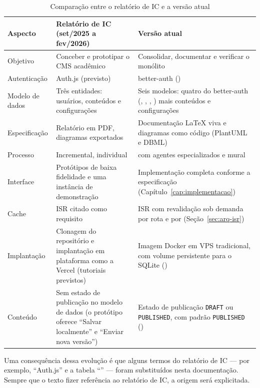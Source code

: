 \begin{table}[htb]
\caption{Comparação entre o relatório de IC e a versão atual}\label{tab:ic-vs-atual}
\small
\begin{tabularx}{\linewidth}{@{}L{2.9cm}YY@{}}
\toprule
\textbf{Aspecto} & \textbf{Relatório de IC (set/2025 a fev/2026)} & \textbf{Versão atual}\\
\midrule
Objetivo & Conceber e prototipar o CMS acadêmico & Consolidar, documentar e verificar o monólito\\
\addlinespace
Autenticação & Auth.js (previsto) & better-auth ()\\
\addlinespace
Modelo de dados & Três entidades: usuários, conteúdos e configurações & Seis modelos: quatro do better-auth (, , , ) mais conteúdos e configurações\\
\addlinespace
Especificação & Relatório em PDF, diagramas exportados & Documentação \LaTeX{} viva e diagramas como código (PlantUML e DBML)\\
\addlinespace
Processo & Incremental, individual &  com agentes especializados e mural\\
\addlinespace
Interface & Protótipos de baixa fidelidade e uma instância de demonstração & Implementação completa conforme a especificação (Capítulo~\ref{cap:implementacao})\\
\addlinespace
Cache & ISR citado como requisito & ISR com revalidação sob demanda por rota e por  (Seção~\ref{sec:arq-isr})\\
\addlinespace
Implantação & Clonagem do repositório e implantação em plataforma como a Vercel (tutoriais previstos) & Imagem Docker em VPS tradicional, com volume persistente para o SQLite ()\\
\addlinespace
Conteúdo & Sem estado de publicação no modelo de dados (o protótipo oferece ``Salvar localmente'' e ``Enviar nova versão'') & Estado de publicação \texttt{DRAFT} ou \texttt{PUBLISHED}, com padrão \texttt{PUBLISHED} ()\\
\bottomrule
\end{tabularx}
\end{table}

Uma consequência dessa evolução é que alguns termos do relatório de IC --- por exemplo, ``Auth.js'' e a tabela ``'' --- foram substituídos nesta documentação. Sempre que o texto fizer referência ao relatório de IC, a origem será explicitada.

